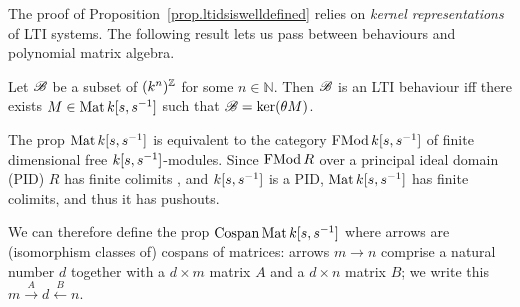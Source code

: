 

The proof of Proposition~\ref{prop.ltidsiswelldefined} relies on \emph{kernel
representations} of LTI  systems.  The following result lets us pass between
behaviours and polynomial matrix algebra.
%
%
\begin{theorem} \label{thm.kernelreps}
  Let ${\mathscr B}$ be a subset of $(k^n)^{\mathbb Z}$ for some $n \in \mathbb N$. Then ${\mathscr B}$ is
  an LTI behaviour iff there exists $M \in
  \operatorname{\mathrm{Mat}}{k[s,s^{-1}]}$ such that ${\mathscr B} = \mathrm{ker}(\theta M)$.
\end{theorem}


The prop $\operatorname{\mathrm{Mat}} {k[s,s^{-1}]}$ is equivalent to the category $\operatorname{\mathrm{FMod}}{k[s,s^{-1}]}$ of
finite dimensional free ${k[s,s^{-1}]}$-modules. Since $\operatorname{\mathrm{FMod}} R$ over a principal ideal
domain (PID) $R$ has finite colimits \cite{BSZ2}, and ${k[s,s^{-1}]}$ is a PID, $\operatorname{\mathrm{Mat}} {k[s,s^{-1}]}$
has finite colimits, and thus it has pushouts.

We can therefore define the prop $\operatorname{{Cospan}}\operatorname{\mathrm{Mat}}{k[s,s^{-1}]}$ where arrows are (isomorphism
classes of) cospans of matrices: arrows $m \to n$ comprise a natural number
$d$ together with a $d\times m$ matrix $A$ and a $d\times n$ matrix $B$; we
write this $m\xrightarrow{A} d \xleftarrow{B}n$. 

